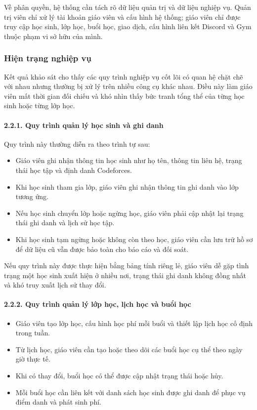 \documentclass[12pt,a4paper]{article}
\begin{document}
Về phân quyền, hệ thống cần tách rõ dữ liệu quản trị và dữ liệu nghiệp vụ. Quản
trị viên chỉ xử lý tài khoản giáo viên và cấu hình hệ thống; giáo viên chỉ được
truy cập học sinh, lớp học, buổi học, giao dịch, cấu hình liên kết Discord và Gym thuộc
phạm vi sở hữu của mình.

\subsubsection{Hiện trạng nghiệp vụ}

Kết quả khảo sát cho thấy các quy trình nghiệp vụ cốt lõi có quan hệ chặt chẽ
với nhau nhưng thường bị xử lý trên nhiều công cụ khác nhau. Điều này làm giáo
viên mất thời gian đối chiếu và khó nhìn thấy bức tranh tổng thể của từng học
sinh hoặc từng lớp học.

\paragraph{2.2.1. Quy trình quản lý học sinh và ghi danh}

Quy trình này thường diễn ra theo trình tự sau:

\begin{itemize}[leftmargin=*]
    \item Giáo viên ghi nhận thông tin học sinh như họ tên, thông tin liên hệ,
    trạng thái học tập và định danh Codeforces.
    \item Khi học sinh tham gia lớp, giáo viên ghi nhận thông tin ghi danh vào
    lớp tương ứng.
    \item Nếu học sinh chuyển lớp hoặc ngừng học, giáo viên phải cập nhật lại
    trạng thái ghi danh và lịch sử học tập.
    \item Khi học sinh tạm ngừng hoặc không còn theo học, giáo viên cần lưu trữ
    hồ sơ để dữ liệu cũ vẫn được bảo toàn cho báo cáo và đối soát.
\end{itemize}

Nếu quy trình này được thực hiện bằng bảng tính riêng lẻ, giáo viên dễ gặp tình
trạng một học sinh xuất hiện ở nhiều nơi, trạng thái ghi danh không đồng nhất và
khó truy xuất lịch sử thay đổi.

\paragraph{2.2.2. Quy trình quản lý lớp học, lịch học và buổi học}

\begin{itemize}[leftmargin=*]
    \item Giáo viên tạo lớp học, cấu hình học phí mỗi buổi và thiết lập lịch học
    cố định trong tuần.
    \item Từ lịch học, giáo viên cần tạo hoặc theo dõi các buổi học cụ thể theo
    ngày giờ thực tế.
    \item Khi có thay đổi, buổi học có thể được cập nhật trạng thái hoặc hủy.
    \item Mỗi buổi học cần liên kết với danh sách học sinh được ghi danh để phục
    vụ điểm danh và phát sinh phí.
\end{itemize}
\end{document}
